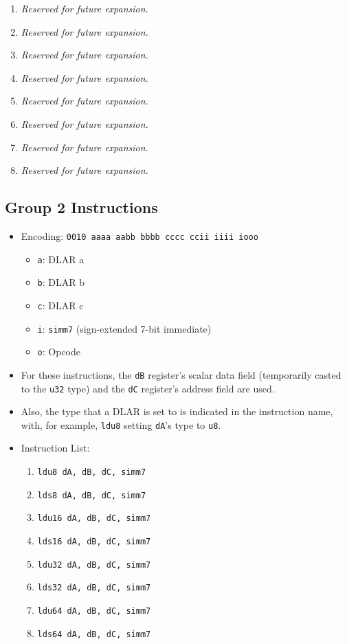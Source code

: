 \documentclass{article}
\begin{document}
\begin{itemize}
\begin{enumerate}
			\item \textit{Reserved for future expansion.}
			\item \textit{Reserved for future expansion.}
			\item \textit{Reserved for future expansion.}
			\item \textit{Reserved for future expansion.}

			\item \textit{Reserved for future expansion.}
			\item \textit{Reserved for future expansion.}
			\item \textit{Reserved for future expansion.}
			\item \textit{Reserved for future expansion.}
			\end{enumerate}
		\end{itemize}
		\newpage

	\subsection{Group 2 Instructions}
		\begin{itemize}
		\item Encoding: \texttt{0010 aaaa aabb bbbb  cccc ccii iiii iooo}
			\begin{itemize}
			\item \texttt{a}: DLAR a
			\item \texttt{b}: DLAR b
			\item \texttt{c}: DLAR c
			\item \texttt{i}: \texttt{simm7} (sign-extended 7-bit
				immediate)
			\item \texttt{o}: Opcode
			\end{itemize}
		\item For these instructions, the \texttt{dB} register's scalar
			data field (temporarily casted to the \texttt{u32} type) and
			the \texttt{dC} register's address field are used. 
		\item Also, the type that a DLAR is set to is indicated in the
			instruction name, with, for example, \texttt{ldu8} setting
			\texttt{dA}'s type to \texttt{u8}.
		\item Instruction List:
			\begin{enumerate}
			\item \texttt{ldu8 dA, dB, dC, simm7}
			\item \texttt{lds8 dA, dB, dC, simm7}
			\item \texttt{ldu16 dA, dB, dC, simm7}
			\item \texttt{lds16 dA, dB, dC, simm7}
			\item \texttt{ldu32 dA, dB, dC, simm7}
			\item \texttt{lds32 dA, dB, dC, simm7}
			\item \texttt{ldu64 dA, dB, dC, simm7}
			\item \texttt{lds64 dA, dB, dC, simm7}
			\end{enumerate}
		\end{itemize}
		\newpage
\end{document}
